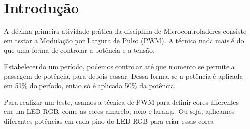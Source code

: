 \section{Introdução}

A décima primeira atividade prática da disciplina de Microcontroladores consiste em testar a Modulação por Largura de Pulso (PWM). A técnica nada mais é do que uma forma de controlar a potência e a tensão.

Estabelecendo um período, podemos controlar até que momento se permite a passagem de potência, para depois cessar. Dessa forma, se a potência é aplicada em 50\% do período, então só é aplicada 50\% da potência.

Para realizar um teste, usamos a técnica de PWM para definir cores diferentes em um LED RGB, como as cores amarelo, roxo e laranja. Ou seja, aplicamos diferentes potências em cada pino do LED RGB para criar essas cores.